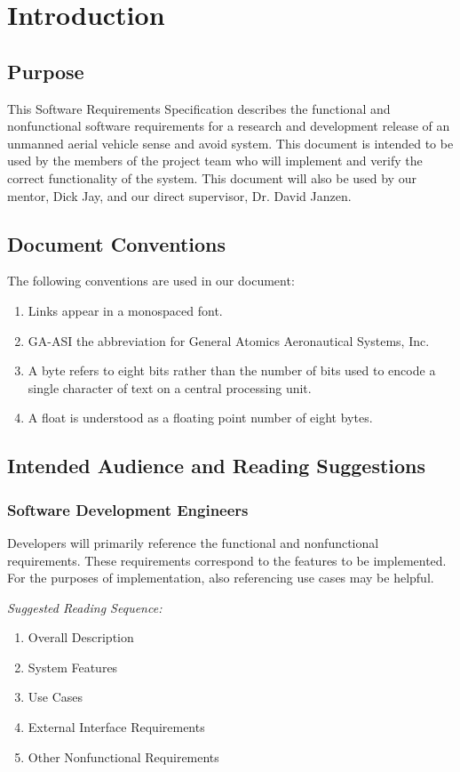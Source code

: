 \documentclass[12pt,oneside,letterpaper]{article}
\begin{document}
\newpage

\section{Introduction}
\subsection{Purpose}
This Software Requirements Specification describes the functional and nonfunctional software requirements for a research and development release of an unmanned aerial vehicle sense and avoid system. This document is intended to be used by the members of the project team who will implement and verify the correct functionality of the system. This document will also be used by our mentor, Dick Jay, and our direct supervisor, Dr. David Janzen.

\subsection{Document Conventions}
The following conventions are used in our document:
\begin{enumerate}
\item Links appear in a monospaced font.
\item GA-ASI the abbreviation for General Atomics Aeronautical Systems, Inc.
\item A byte refers to eight bits rather than the number of bits used to encode a single character of text on a central processing unit.
\item A float is understood as a floating point number of eight bytes.
\end{enumerate}

\subsection{Intended Audience and Reading Suggestions}

\subsubsection{Software Development Engineers}
Developers will primarily reference the functional and nonfunctional requirements. These requirements correspond to the features to be implemented. For the purposes of implementation, also referencing use cases may be helpful.\newline

\textit{Suggested Reading Sequence:}
\begin{enumerate}
\item Overall Description
\item System Features
\item Use Cases
\item External Interface Requirements
\item Other Nonfunctional Requirements
\end{enumerate}
\end{document}
